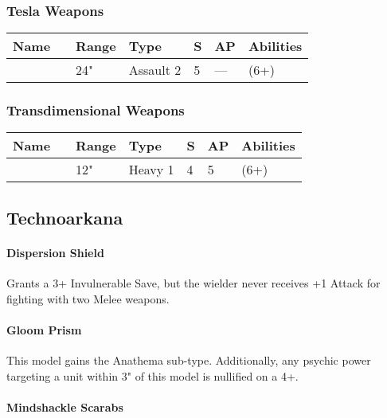 \subsubsection{Tesla Weapons}
\label{Tesla Carbine}
\noindent
\begin{tabular}{||m{110pt} m{30pt} m{31pt} m{55pt} m{12pt} m{12pt} m{210pt}||}
	\hline
	Name & & Range & Type & S & AP & Abilities \\
	\hline
	\quickref{Tesla Carbine} & & 24" & Assault 2 & 5 & — & \quickref{Tesla} (6+) \\	
	\hline
\end{tabular}


\subsubsection{Transdimensional Weapons}
\label{Transdimensional Beamer}
\noindent
\begin{tabular}{||m{110pt} m{30pt} m{31pt} m{55pt} m{12pt} m{12pt} m{210pt}||}
	\hline
	Name & & Range & Type & S & AP & Abilities \\
	\hline
	\quickref{Transdimensional Beamer} & & 12" & Heavy 1 & 4 & 5 & \quickref{Exile Ray} (6+) \\	
	\hline
\end{tabular}


\subsection{Technoarkana} \label{Technoarcana}

\paragraph*{Dispersion Shield} \label{Dispersion Shield}

Grants a 3+ Invulnerable Save, but the wielder never receives +1 Attack for fighting with two Melee weapons.

\paragraph*{Gloom Prism} \label{Gloom Prism}

This model gains the Anathema sub-type. Additionally, any psychic power targeting a unit within 3" of this model is nullified on a 4+. \\

\paragraph*{Mindshackle Scarabs} \label{Mindshackle Scarabs}

